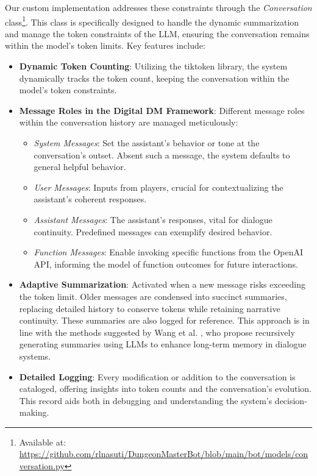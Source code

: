 \documentclass[letterpaper]{article}
\begin{document}
Our custom implementation addresses these constraints through the \textit{Conversation} class\footnote{Available at: \url{https://github.com/rlnasuti/DungeonMasterBot/blob/main/bot/models/conversation.py}}. This class is specifically designed to handle the dynamic summarization and manage the token constraints of the LLM, ensuring the conversation remains within the model's token limits. Key features include:

\begin{itemize}
\item \textbf{Dynamic Token Counting}: Utilizing the tiktoken library, the system dynamically tracks the token count, keeping the conversation within the model's token constraints.

\item \textbf{Message Roles in the Digital DM Framework}: 
Different message roles within the conversation history are managed meticulously:
\begin{itemize}
    \item \textit{System Messages}: Set the assistant's behavior or tone at the conversation's outset. Absent such a message, the system defaults to general helpful behavior.
    
    \item \textit{User Messages}: Inputs from players, crucial for contextualizing the assistant's coherent responses.
    
    \item \textit{Assistant Messages}: The assistant's responses, vital for dialogue continuity. Predefined messages can exemplify desired behavior.
    
    \item \textit{Function Messages}: Enable invoking specific functions from the OpenAI API, informing the model of function outcomes for future interactions.
\end{itemize}

\item \textbf{Adaptive Summarization}: Activated when a new message risks exceeding the token limit. Older messages are condensed into succinct summaries, replacing detailed history to conserve tokens while retaining narrative continuity. These summaries are also logged for reference. This approach is in line with the methods suggested by Wang et al. \cite{wang2023recursively}, who propose recursively generating summaries using LLMs to enhance long-term memory in dialogue systems.

\item \textbf{Detailed Logging}: Every modification or addition to the conversation is cataloged, offering insights into token counts and the conversation's evolution. This record aids both in debugging and understanding the system's decision-making.
\end{itemize}
\end{document}
